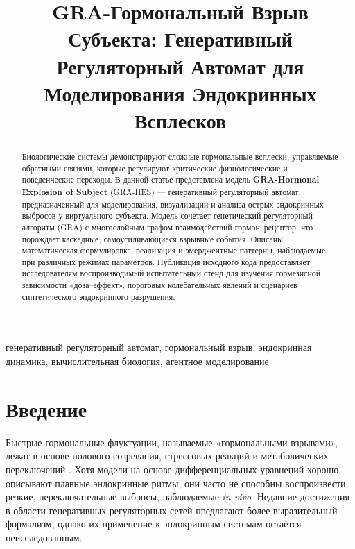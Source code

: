 \documentclass[conference]{IEEEtran}
\begin{document}
\renewcommand{\abstractname}{Аннотация}
\renewcommand{\IEEEkeywordsname}{Ключевые слова}

\title{GRA-Гормональный Взрыв Субъекта: Генеративный Регуляторный Автомат для Моделирования Эндокринных Всплесков}

\author{
}

\maketitle

\begin{abstract}
Биологические системы демонстрируют сложные гормональные всплески, управляемые обратными связями, которые регулируют критические физиологические и поведенческие переходы. В данной статье представлена модель \textbf{GRA-Hormonal Explosion of Subject} (GRA-HES) — генеративный регуляторный автомат, предназначенный для моделирования, визуализации и анализа острых эндокринных выбросов у виртуального субъекта. Модель сочетает генетический регуляторный алгоритм (GRA) с многослойным графом взаимодействий гормон–рецептор, что порождает каскадные, самоусиливающиеся взрывные события. Описаны математическая формулировка, реализация и эмерджентные паттерны, наблюдаемые при различных режимах параметров. Публикация исходного кода предоставляет исследователям воспроизводимый испытательный стенд для изучения гормезисной зависимости «доза–эффект», пороговых колебательных явлений и сценариев синтетического эндокринного разрушения.
\end{abstract}

\begin{IEEEkeywords}
генеративный регуляторный автомат, гормональный взрыв, эндокринная динамика, вычислительная биология, агентное моделирование
\end{IEEEkeywords}

\section{Введение}
Быстрые гормональные флуктуации, называемые «гормональными взрывами», лежат в основе полового созревания, стрессовых реакций и метаболических переключений \cite{m1}. Хотя модели на основе дифференциальных уравнений хорошо описывают плавные эндокринные ритмы, они часто не способны воспроизвести резкие, переключательные выбросы, наблюдаемые \textit{in vivo}. Недавние достижения в области генеративных регуляторных сетей \cite{m2} предлагают более выразительный формализм, однако их применение к эндокринным системам остаётся неисследованным.
\end{document}
